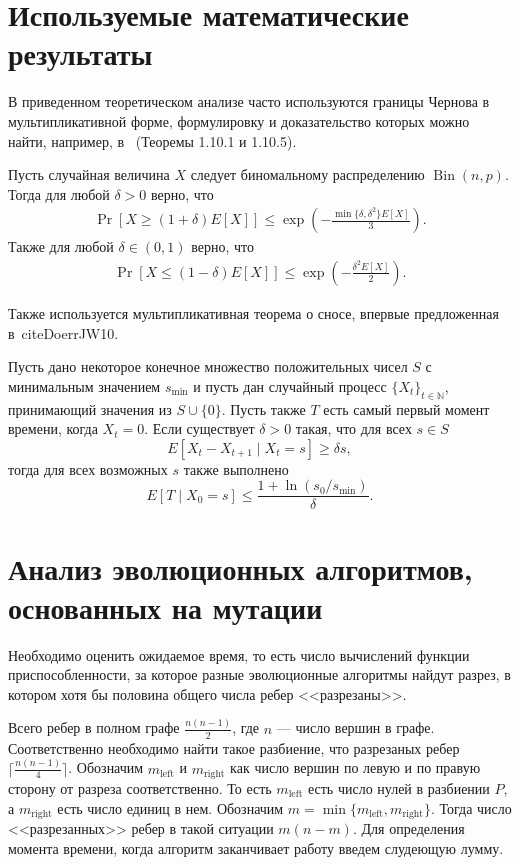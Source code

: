 \documentclass[times]{itmo-student-thesis}
\newcommand{\N}{{\mathbb N}}
\DeclareMathOperator{\Bin}{Bin}
\begin{document}
\section{Используемые математические результаты}

В приведенном теоретическом анализе часто используются границы Чернова в мультипликативной форме, формулировку и доказательство которых можно найти, например, в~\cite{Doerr20bookchapter} (Теоремы 1.10.1 и 1.10.5).

\begin{lemma}\label{lem:chernoff}
  Пусть случайная величина $X$ следует биномальному распределению $\Bin(n, p)$. Тогда для любой $\delta > 0$ верно, что
  \begin{align*}
    \Pr[X \ge (1 + \delta)E[X]] \le \exp\left(-\frac{\min\{\delta, \delta^2\}E[X]}{3}\right).
  \end{align*}
  Также для любой $\delta \in (0, 1)$ верно, что
  \begin{align*}
    \Pr[X \le (1 - \delta)E[X]] \le \exp\left(-\frac{\delta^2 E[X]}{2}\right).
  \end{align*}
\end{lemma}

Также используется мультипликативная теорема о сносе, впервые предложенная в~cite{DoerrJW10}.

\begin{theorem}\label{thm:mult-drift}
  Пусть дано некоторое конечное множество положительных чисел $S$ с минимальным значением $s_{\min}$ и пусть дан случайный процесс $\{X_t\}_{t \in \N}$, принимающий значения из $S \cup \{0\}$. Пусть также $T$ есть самый первый момент времени, когда $X_t = 0$. Если существует $\delta > 0$ такая, что для всех $s \in S$
  \[
    E\left[X_t - X_{t + 1} \mid X_t = s\right] \ge \delta s,
  \]
  тогда для всех возможных $s$ также выполнено
  \[
    E[T \mid X_0 = s] \le \frac{1 + \ln(s_0/s_{\min})}{\delta}.
  \]
\end{theorem}

\section{Анализ эволюционных алгоритмов, основанных на мутации}
Необходимо оценить ожидаемое время, то есть число вычислений функции приспособленности, за которое разные эволюционные алгоритмы найдут разрез, в котором хотя бы половина общего числа ребер <<разрезаны>>.

Всего ребер в полном графе $\frac{n(n-1)}{2}$, где $n$ --- число вершин в графе.
Соответственно необходимо найти такое разбиение, что разрезаных ребер $\lceil \frac{n(n-1)}{4} \rceil$.
Обозначим $m_{\text{left}}$ и $m_{\text{right}}$ как число вершин по левую и по правую сторону от разреза соответственно. То есть $m_{\text{left}}$ есть число нулей в разбиении $P$, а $m_{\text{right}}$ есть число единиц в нем.
Обозначим $m = \min\{m_{\text{left}}, m_{\text{right}}\}$.
Тогда число <<разрезанных>> ребер в такой ситуации $m(n-m)$. Для определения момента времени, когда алгоритм заканчивает работу введем слудеющую лумму.
\end{document}

